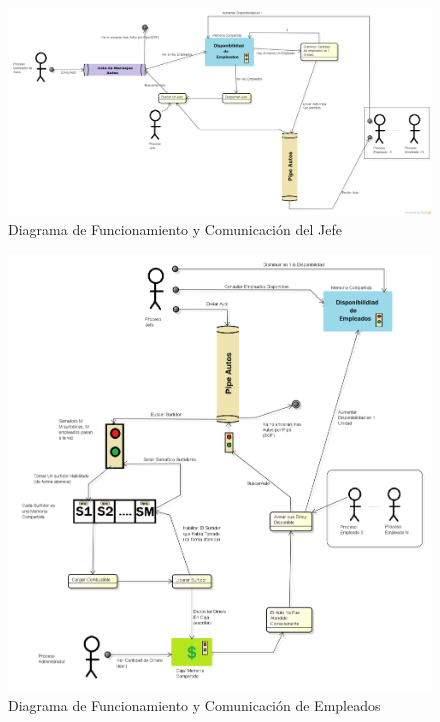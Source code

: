 \documentclass[a4paper,12pt]{article}
\begin{document}
\begin{figure}
\centering
\includegraphics[scale=0.3]{Diagramas/Jefe.png}
\caption{Diagrama de Funcionamiento y Comunicación del Jefe}
\label{fig:Jefe}
\end{figure}	

\begin{figure}
\centering
\includegraphics[scale=0.4]{Diagramas/empleados.png}
\caption{Diagrama de Funcionamiento y Comunicación de Empleados}
\label{fig:Empleados}
\end{figure}
\end{document}
